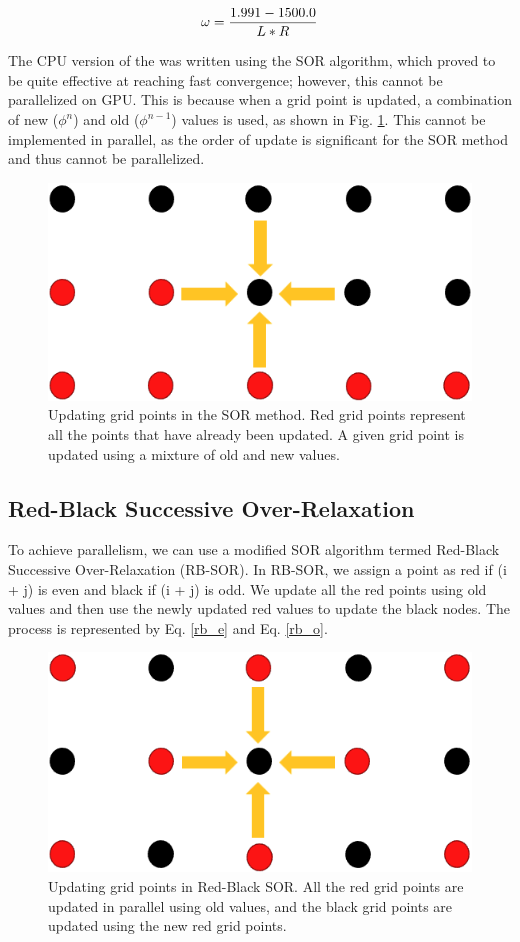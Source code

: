 \begin{equation}{\label{omg}}
\omega = \frac{1.991 - 1500.0}{L*R}
\end{equation}

The CPU version of the {\ehd} was written using the SOR algorithm, which proved to be quite effective at reaching fast convergence; however, this cannot be parallelized on GPU. This is because when a grid point is updated, a combination of new ($\phi^{n}$) and old ($\phi^{n-1}$) values is used, as shown in Fig. \ref{fig:sor_methods}. This cannot be implemented in parallel, as the order of update is significant for the SOR method and thus cannot be parallelized.


\begin{figure}[!htb]
\centering
\includegraphics[width=0.4\linewidth]{ch4/figs/SOR.png}
\caption{\label{fig:sor_methods} Updating grid points in the SOR method. Red grid points represent all the points that have already been updated. A given grid point is updated using a mixture of old and new values.}
\end{figure}

\subsection{Red-Black Successive Over-Relaxation}
To achieve parallelism, we can use a modified SOR algorithm termed Red-Black Successive Over-Relaxation (RB-SOR)\cite{RB_SOR_paper}. In RB-SOR, we assign a point as red if (i + j) is even and black if (i + j) is odd. We update all the red points using old values and then use the newly updated red values to update the black nodes. The process is represented by Eq. \ref{rb_e} and Eq. \ref{rb_o}.


\begin{figure}[!htb]
\centering
 \includegraphics[width=0.4\linewidth]{ch4/figs/RB-SOR.png}
\caption{\label{fig:rb_sor_methods} Updating grid points in Red-Black SOR. All the red grid points are updated in parallel using old values, and the black grid points are updated using the new red grid points.}
\end{figure}

